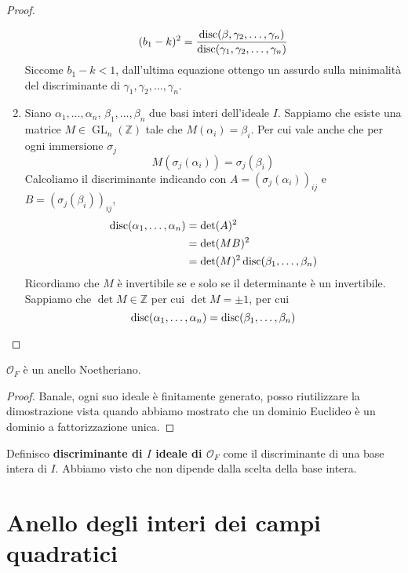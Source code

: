 \begin{proof}
\begin{enumerate}
\begin{equation*}
		(b_1-k)^2=\frac{\operatorname{disc}(\beta,\gamma_2,\dots,\gamma_n)}{\operatorname{disc}(\gamma_1,\gamma_2,\dots,\gamma_n)}
		\end{equation*}
		Siccome $b_1-k<1$, dall'ultima equazione ottengo un assurdo sulla minimalità del discriminante di $\gamma_1,\gamma_2,\dots,\gamma_n$.
		\item 
			Siano $\alpha_1, \dots, \alpha_n$, $\beta_1, \dots, \beta_n$ due basi interi dell'ideale $I$.
			Sappiamo che esiste una matrice $M \in \operatorname{GL}_{n}(\mathbb{Z})$ tale che 
			$M(\alpha_i) = \beta_i$. Per cui vale anche che per ogni immersione $\sigma_j$
			\begin{equation*}
				M(\sigma_j(\alpha_i)) = \sigma_j(\beta_i)
			\end{equation*}
			Calcoliamo il discriminante indicando con $A = (\sigma_j(\alpha_i))_{ij}$ e 
			$B = (\sigma_j(\beta_i))_{ij}$,
			\begin{align*}
				\operatorname{disc}(\alpha_1, \dots, \alpha_n) & = \det(A)^2 \\
												 & = \det(M B)^2 \\
												 & = \det(M)^2 \operatorname{disc}(\beta_1, \dots, \beta_n) 
			\end{align*} 
			Ricordiamo che $M$ è invertibile se e solo se il determinante è un invertibile. Sappiamo 
			che $\det M \in \mathbb{Z}$ per cui $\det M = \pm 1$, per cui 
			\begin{equation*}
				\operatorname{disc}(\alpha_1, \dots, \alpha_n) = \operatorname{disc}(\beta_1, \dots, \beta_n)
			\end{equation*} 
	\end{enumerate}
\end{proof}
\begin{corollario}
	$\mathcal{O}_F$ è un anello Noetheriano.
\end{corollario}
\begin{proof}
	Banale, ogni suo ideale è finitamente generato, posso riutilizzare la dimostrazione vista quando abbiamo mostrato che un dominio Euclideo è un dominio a fattorizzazione unica.
\end{proof}
\begin{definizione}
	Definisco \textbf{discriminante di $I$ ideale di $\mathcal{O}_F$} come il discriminante di una base intera di $I$. Abbiamo visto che non dipende dalla scelta della base intera.
\end{definizione}




\section{Anello degli interi dei campi quadratici}
